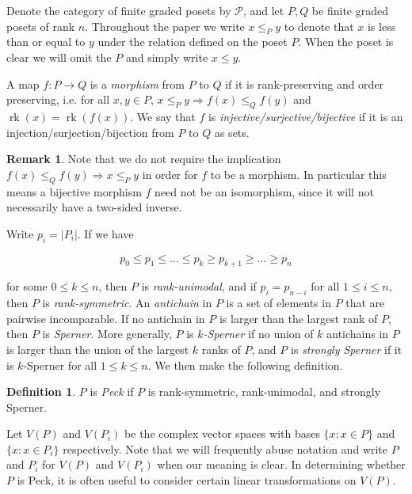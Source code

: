 \documentclass[10 pt]{amsart}
\theoremstyle{plain}
\theoremstyle{definition}
\newtheorem{defn}[thm]{Definition}
\newtheorem{rem}[thm]{Remark}
\theoremstyle{remark}
\numberwithin{equation}{section}
\newcommand\rk{\operatorname{rk}}
\begin{document}
Denote the category of finite graded posets by $\mathcal{P}$, and let $P,Q$ be finite graded posets of rank $n$.  Throughout the paper we write $x\le_P y$ to denote that $x$ is less than or equal to $y$ under the relation defined on the poset $P$.  When the poset is clear we will omit the $P$ and simply write $x\le y$.  

A map $f\colon P\rightarrow Q$ is a \textit{morphism} from $P$ to $Q$ if it is rank-preserving and order preserving, i.e. for all $x,y\in P$, $x\le_P y \Rightarrow f(x)\le_Q f(y)$ and $\rk(x) = \rk(f(x))$.  We say that $f$ is \textit{injective/surjective/bijective} if it is an injection/surjection/bijection from $P$ to $Q$ as sets.

\begin{rem}\label{rem:bijective_morphism_not_isomorphism}
Note that we do not require the implication $f(x)\le_Q f(y) \Rightarrow x\le_P y$ in order for $f$ to be a morphism.  In particular this means a bijective morphism $f$ need not be an isomorphism, since it will not necessarily have a two-sided inverse.  
\end{rem}

Write $p_i = |P_i|$.  If we have

$$p_0\le p_1\le \ldots \le p_k \ge p_{k+1} \ge\ldots \ge p_n$$

\noindent for some $0\le k\le n$, then $P$ is \textit{rank-unimodal}, and if $p_i = p_{n-i}$ for all $1\le i\le n,$ then $P$ is \textit{rank-symmetric}.  An \textit{antichain} in $P$ is a set of elements in $P$ that are pairwise incomparable.  If no antichain in $P$ is larger than the largest rank of $P$, then $P$ is \textit{Sperner}.  More generally, $P$ is \textit{$k$-Sperner} if no union of $k$ antichains in $P$ is larger than the union of the largest $k$ ranks of $P$, and $P$ is \textit{strongly Sperner} if it is $k$-Sperner for all $1\le k\le n$.  We then make the following definition.

\begin{defn}
$P$ is \textit{Peck} if $P$ is rank-symmetric, rank-unimodal, and strongly Sperner.
\end{defn}


Let $V(P)$ and $V(P_i)$ be the complex vector spaces with bases $\{x :x\in P\}$ and $\{x :x\in P_i\}$ respectively.  Note that we will frequently abuse notation and write $P$ and $P_i$ for $V(P)$ and $V(P_i)$ when our meaning is clear.  In determining whether $P$ is Peck, it is often useful to consider certain linear transformations on $V(P)$.
\end{document}
